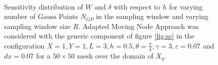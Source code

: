 \begin{figure}[ht]
\centering
{}%
    \\
    \caption{Sensitivity distribution of $W$ and $\delta$ with respect to $h$ for varying number of Gauss Points $N_{GP}$ in the sampling window and varying sampling window size $R$. Adapted Moving Node Approach was considered with the generic component of figure \ref{fig:sc} in the configuration  $X=1,Y=1,L=3,h=0.5,\theta=\frac{\pi}{4}, \gamma=3, \varepsilon=0.07$ and  $dx=0.07$ for a $50\times50$ mesh over the domain of $X_g$.}%
    \label{fig:sensh}%
\end{figure}
